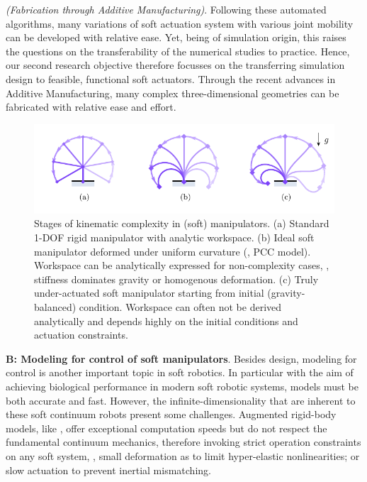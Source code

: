 \textit{(Fabrication through Additive Manufacturing)}. Following these automated algorithms, many variations of soft actuation system with various joint mobility can be developed with relative ease. Yet, being of simulation origin, this raises the questions on the transferability of the numerical studies to practice. Hence, our second research objective therefore focusses on the transferring simulation design to feasible, functional soft actuators. Through the recent advances in Additive Manufacturing, many complex three-dimensional geometries can be fabricated with relative ease and effort. 


\begin{figure}[!t]
  \centering
  \hspace{-2mm}
  \includegraphics*[width=\textwidth]{./pdf/thesis-figure-1-model.pdf}
  \vspace{-4mm}
  \caption{Stages of kinematic complexity in (soft) manipulators. (a) Standard 1-DOF rigid manipulator with analytic workspace. (b) Ideal soft manipulator deformed under uniform curvature (\ie, PCC model). Workspace can be analytically expressed for non-complexity cases, \eg, stiffness dominates gravity or homogenous deformation. (c) Truly under-actuated soft manipulator starting from initial (gravity-balanced) condition. Workspace can often not be derived analytically and depends highly on the initial conditions and actuation constraints.}
  \label{fig:C0:contribTwo}
  \vspace{-4mm}
\end{figure}

\noindent \textbf{B: Modeling for control of soft manipulators}. Besides design, modeling for control is another important topic in soft robotics. In particular with the aim of achieving biological performance in modern soft robotic systems, models must be both accurate and fast. However, the infinite-dimensionality that are inherent to these soft continuum robots present some challenges. Augmented rigid-body models, like \cite{Katzschmann2019,Milana2021Apr,Franco2020}, offer exceptional computation speeds but do not respect the fundamental continuum mechanics, therefore invoking strict operation constraints on any soft system, \ie, small deformation as to limit hyper-elastic nonlinearities; or slow actuation to prevent inertial mismatching. 


